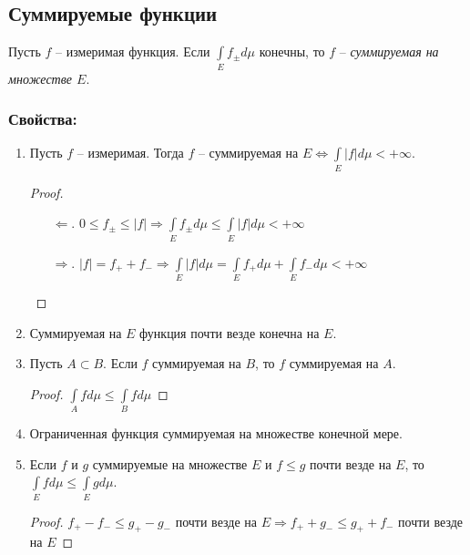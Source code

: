 \subsection{Суммируемые функции}

\begin{definition}
    Пусть $f$ – измеримая функция. Если $\int\limits_E f_\pm d\mu$ конечны, то $f$ – 
    \textit{суммируемая на множестве $E$}.
\end{definition}

\subsubsection*{Свойства:}

\begin{enumerate}
    \item Пусть $f$ – измеримая. Тогда $f$ – суммируемая на $E\Leftrightarrow 
    \int\limits_E|f|d\mu <+\infty$.

    \begin{proof}
        \begin{enumerate}
            \item[$\Leftarrow$.] $0\leq f_\pm \leq |f|\Rightarrow \int\limits_Ef_\pm d\mu \leq 
            \int\limits_E|f|d\mu <+\infty$
            \item[$\Rightarrow$.] $|f|=f_++f_-\Rightarrow \int\limits_E|f|d\mu=\int\limits_E f_+d\mu+\int\limits_Ef_-d\mu
            <+\infty$
        \end{enumerate}
    \end{proof}

    \item Суммируемая на $E$ функция почти везде конечна на $E$.
    
    \item Пусть $A\subset B$. Если $f$ суммируемая на $B$, то $f$ суммируемая на $A$.
    
    \begin{proof}
        $\int\limits_Afd\mu\leq \int\limits_Bfd\mu$
    \end{proof}

    \item Ограниченная функция суммируемая на множестве конечной мере.
    
    \item Если $f$ и $g$ суммируемые на множестве $E$ и $f\leq g$ почти везде на $E$, то 
    $\int\limits_E f d\mu\leq \int\limits_E g d\mu$.

    \begin{proof}
        $f_+-f_-\leq g_+ - g_-$ почти везде на $E\Rightarrow f_+ + g_-\leq g_+ + f_-$ почти везде на $E$ 


\end{proof}
\end{enumerate}
